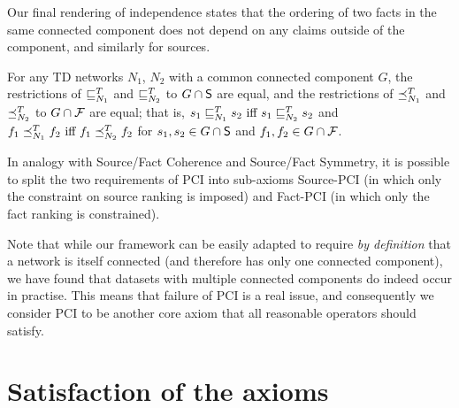 
Our final rendering of independence states that the ordering of two facts in
the same connected component does not depend on any claims outside of the
component, and similarly for sources.

\begin{axiom}
For any TD networks $N_1$, $N_2$ with a common connected component
$G$, the restrictions of $\sle_{N_1}^T$ and $\sle_{N_2}^T$ to $G \cap \S$ are
equal, and the restrictions of $\fle_{N_1}^T$ and $\fle_{N_2}^T$ to $G \cap \F$
are equal; that is,
    $s_1 \sle_{N_1}^T s_2\ \textrm{iff } s_1 \sle_{N_2}^T s_2$
and
    $f_1 \fle_{N_1}^T f_2\ \textrm{iff } f_1 \fle_{N_2}^T f_2$
for $s_1, s_2 \in G \cap \S$ and $f_1, f_2 \in G \cap \F$.

\end{axiom}

In analogy with Source/Fact Coherence and Source/Fact Symmetry, it is possible
to split the two requirements of PCI into sub-axioms Source-PCI (in which only
the constraint on source ranking is imposed) and Fact-PCI (in which only the
fact ranking is constrained).

Note that while our framework can be easily adapted to require \emph{by
definition} that a network is itself connected (and therefore has only one
connected component), we have found that datasets with multiple connected
components do indeed occur in practise.\footnotemark{} This means that failure
of PCI is a real issue, and consequently we consider PCI to be another core
axiom that all reasonable operators should satisfy.


\section{Satisfaction of the axioms}
\label{td_sec_satisfaction_of_axioms}

